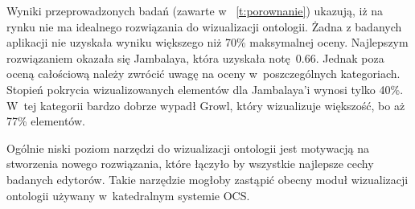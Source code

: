 Wyniki przeprowadzonych badań (zawarte w  \tablename~\ref{t:porownanie}) ukazują, iż na rynku nie ma idealnego rozwiązania do wizualizacji ontologii. 
Żadna z badanych aplikacji nie uzyskała wyniku większego niż 70\% maksymalnej oceny.  Najlepszym rozwiązaniem okazała się Jambalaya, która uzyskała 
notę~0.66. Jednak poza oceną całościową należy zwrócić uwagę na oceny w~poszczególnych kategoriach. Stopień pokrycia 
wizualizowanych elementów dla Jambalaya'i wynosi tylko 40\%. W~tej kategorii bardzo dobrze wypadł Growl, który wizualizuje większość, bo aż 77\% elementów.
\par Ogólnie niski poziom narzędzi do wizualizacji ontologii jest motywacją na stworzenia nowego rozwiązania, które łączyło by wszystkie najlepsze cechy
 badanych edytorów. Takie narzędzie mogłoby zastąpić obecny moduł wizualizacji ontologii używany w~katedralnym systemie OCS. 

